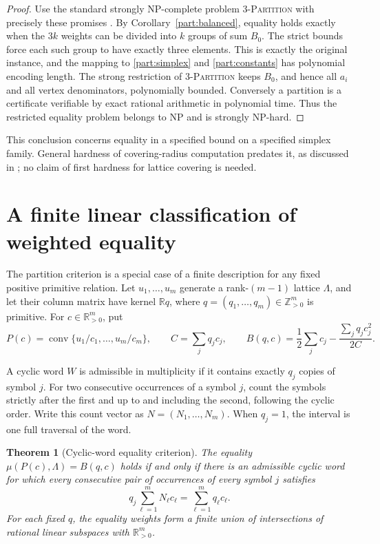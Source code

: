 \documentclass[11pt,a4paper]{article}
\newtheorem{theorem}{Theorem}[section]
\theoremstyle{remark}\newtheorem{remark}[theorem]{Remark}
\DeclareMathOperator{\conv}{conv}
\newcommand{\R}{\mathbb R}\newcommand{\Z}{\mathbb Z}
\begin{document}
\begin{proof}
Use the standard strongly NP-complete problem
\textsc{3-Partition} with precisely these promises \cite{GJ}.
By Corollary~\ref{part:balanced}, equality holds exactly when the
$3k$ weights can be divided into $k$ groups of sum $B_0$.
The strict bounds force each such group to have exactly three
elements.  This is exactly the original instance, and the mapping
to \eqref{part:simplex} and \eqref{part:constants} has polynomial
encoding length.  The strong restriction of \textsc{3-Partition}
keeps $B_0$, and hence all $a_i$ and all vertex denominators,
polynomially bounded.  Conversely a partition is a certificate
verifiable by exact rational arithmetic in polynomial time.
Thus the restricted equality problem belongs to NP and is strongly
NP-hard.
\end{proof}

This conclusion concerns equality in a specified bound on a specified
simplex family.  General hardness of covering-radius computation
predates it, as discussed in \cite{CGNS}; no claim of first hardness
for lattice covering is needed.

\section{A finite linear classification of weighted equality}
\label{part:wordssection}

The partition criterion is a special case of a finite description
for any fixed positive primitive relation.  Let
$u_1,\ldots,u_m$ generate a rank-$(m-1)$ lattice $\Lambda$, and let
their column matrix have kernel $\R q$, where
$q=(q_1,\ldots,q_m)\in\Z_{>0}^m$ is primitive.  For
$c\in\R_{>0}^m$, put
\[
 P(c)=\conv\{u_1/c_1,\ldots,u_m/c_m\},\qquad
 C=\sum_jq_jc_j,\qquad
 B(q,c)=\frac12\sum_jc_j-\frac{\sum_jq_jc_j^2}{2C}.
\]

A cyclic word $W$ is admissible in multiplicity if it contains
exactly $q_j$ copies of symbol $j$.  For two consecutive occurrences
of a symbol $j$, count the symbols strictly after the first and
up to and including the second, following the cyclic order.
Write this count vector as $N=(N_1,\ldots,N_m)$.  When $q_j=1$,
the interval is one full traversal of the word.

\begin{theorem}[Cyclic-word equality criterion]\label{part:word}
The equality $\mu(P(c),\Lambda)=B(q,c)$ holds if and only if
there is an admissible cyclic word for which every consecutive
pair of occurrences of every symbol $j$ satisfies
\begin{equation}\label{part:wordeq}
 q_j\sum_{\ell=1}^m N_\ell c_\ell
       =\sum_{\ell=1}^m q_\ell c_\ell.
\end{equation}
For each fixed $q$, the equality weights form a finite union of
intersections of rational linear subspaces with $\R_{>0}^m$.
\end{theorem}
\end{document}
